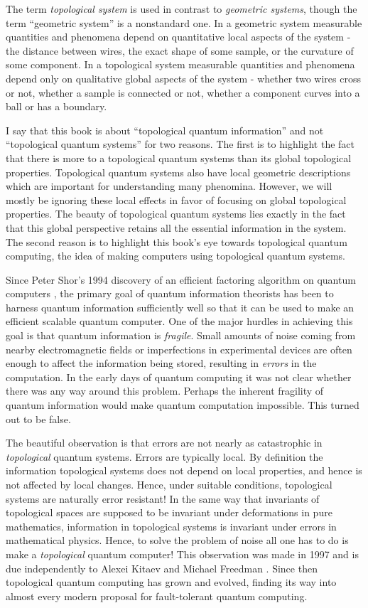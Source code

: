 \documentclass{article}
\theoremstyle{definition}
\newcommand{\0}{\left|0\right>}
\newcommand{\1}{\left|1\right>}
\numberwithin{figure}{section}
\begin{document}
The term \textit{topological system} is used in contrast to \textit{geometric systems}, though the term “geometric system” is a nonstandard one. In a geometric system measurable quantities and phenomena depend on quantitative local aspects of the system - the distance between wires, the exact shape of some sample, or the curvature of some component. In a topological system measurable quantities and phenomena depend only on qualitative global aspects of the system - whether two wires cross or not, whether a sample is connected or not, whether a component curves into a ball or has a boundary.

I say that this book is about “topological quantum information” and not “topological quantum systems” for two reasons. The first is to highlight the fact that there is more to a topological quantum systems than its global topological properties. Topological quantum systems also have local geometric descriptions which are important for understanding many phenomina. However, we will mostly be ignoring these local effects in favor of focusing on global topological properties. The beauty of topological quantum systems lies exactly in the fact that this global perspective retains all the essential information in the system. The second reason is to highlight this book’s eye towards topological quantum computing, the idea of making computers using topological quantum systems. 

Since Peter Shor’s 1994 discovery of an efficient factoring algorithm on quantum computers \cite{shor1994algorithms}, the primary goal of quantum information theorists has been to harness quantum information sufficiently well so that it can be used to make an efficient scalable quantum computer. One of the major hurdles in achieving this goal is that quantum information is \textit{fragile}. Small amounts of noise coming from nearby electromagnetic fields or imperfections in experimental devices are often enough to affect the information being stored, resulting in \textit{errors} in the computation. In the early days of quantum computing it was not clear whether there was any way around this problem. Perhaps the inherent fragility of quantum information would make quantum computation impossible. This turned out to be false.

The beautiful observation is that errors are not nearly as catastrophic in \textit{topological} quantum systems. Errors are typically local. By definition the information topological systems does not depend on local properties, and hence is not affected by local changes. Hence, under suitable conditions, topological systems are naturally error resistant! In the same way that invariants of topological spaces are supposed to be invariant under deformations in pure mathematics, information in topological systems is invariant under errors in mathematical physics. Hence, to solve the problem of noise all one has to do is make a \textit{topological} quantum computer! This observation was made in 1997 and is due independently to Alexei Kitaev and Michael Freedman \cite{kitaev2003fault, freedman1998p}. Since then topological quantum computing has grown and evolved, finding its way into almost every modern proposal for fault-tolerant quantum computing.
\end{document}
